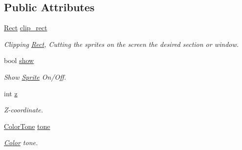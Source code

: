 \subsection*{Public Attributes}
\begin{DoxyCompactItemize}
\item 
\hypertarget{class_f2_c_1_1_viewport_ab28f5a116dbdb5facc9a5116a11582e8}{
\hyperlink{class_f2_c_1_1_rect}{Rect} \hyperlink{class_f2_c_1_1_viewport_ab28f5a116dbdb5facc9a5116a11582e8}{clip\_\-rect}}
\label{class_f2_c_1_1_viewport_ab28f5a116dbdb5facc9a5116a11582e8}

\begin{DoxyCompactList}\small\item\em Clipping \hyperlink{class_f2_c_1_1_rect}{Rect}, Cutting the sprites on the screen the desired section or window. \item\end{DoxyCompactList}\item 
\hypertarget{class_f2_c_1_1_viewport_a0a668b787c2404ad479b74fb6d7c6771}{
bool \hyperlink{class_f2_c_1_1_viewport_a0a668b787c2404ad479b74fb6d7c6771}{show}}
\label{class_f2_c_1_1_viewport_a0a668b787c2404ad479b74fb6d7c6771}

\begin{DoxyCompactList}\small\item\em Show \hyperlink{class_f2_c_1_1_sprite}{Sprite} On/Off. \item\end{DoxyCompactList}\item 
\hypertarget{class_f2_c_1_1_viewport_a7abd237e5e7b3813ed69b9e7885a89df}{
int \hyperlink{class_f2_c_1_1_viewport_a7abd237e5e7b3813ed69b9e7885a89df}{z}}
\label{class_f2_c_1_1_viewport_a7abd237e5e7b3813ed69b9e7885a89df}

\begin{DoxyCompactList}\small\item\em Z-\/coordinate. \item\end{DoxyCompactList}\item 
\hypertarget{class_f2_c_1_1_viewport_abd92aae23fe773ad344513a6b9a9b231}{
\hyperlink{class_f2_c_1_1_color_tone}{ColorTone} \hyperlink{class_f2_c_1_1_viewport_abd92aae23fe773ad344513a6b9a9b231}{tone}}
\label{class_f2_c_1_1_viewport_abd92aae23fe773ad344513a6b9a9b231}

\begin{DoxyCompactList}\small\item\em \hyperlink{class_f2_c_1_1_color}{Color} tone. \item\end{DoxyCompactList}\end{DoxyCompactItemize}
